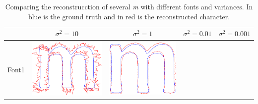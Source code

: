\documentclass[12pt]{article}
\begin{document}
\begin{center}
\begin{table}[h]
\caption[Table caption text]{Comparing the reconstrucction of several \emph{m} with different fonts and variances. In blue is the ground truth and in red is the reconstructed character.}
\label{tab:results}
\begin{tabular}{|c|c|c|c|c|}
\hline
 & $\sigma^2=10$ & $\sigma^2=1$ & $\sigma^2=0.01$ & $\sigma^2=0.001$ \\ \hline
 Font1 & 
\includegraphics[scale = 0.2]{images/f1var10} &
\includegraphics[scale = 0.2]{images/f1var1} &

\end{tabular}
\end{table}
\end{center}
\end{document}
